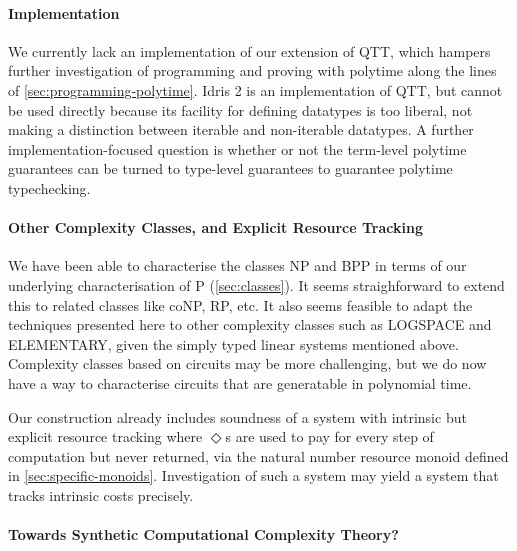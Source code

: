 \documentclass[acmsmall,screen]{acmart}
\begin{document}
\paragraph{Implementation} We currently lack an implementation of our
extension of QTT, which hampers further investigation of programming
and proving with polytime along the lines of
\autoref{sec:programming-polytime}. Idris 2 \cite{Brady21} is an
implementation of QTT, but cannot be used directly because its facility
for defining datatypes is too liberal, not making a distinction
between iterable and non-iterable datatypes. A further
implementation-focused question is whether or not the term-level
polytime guarantees can be turned to type-level guarantees to
guarantee polytime typechecking.

\paragraph{Other Complexity Classes, and Explicit Resource Tracking}
We have been able to characterise the classes NP and BPP in terms of
our underlying characterisation of P (\autoref{sec:classes}). It seems
straighforward to extend this to related classes like coNP, RP,
etc. It also seems feasible to adapt the techniques presented here to
other complexity classes such as LOGSPACE and ELEMENTARY, given the
simply typed linear systems mentioned above. Complexity classes based
on circuits may be more challenging, but we do now have a way to
characterise circuits that are generatable in polynomial
time.

Our construction already includes soundness of a system with intrinsic
but explicit resource tracking where $\Diamond$s are used to pay for
every step of computation but never returned, via the natural number
resource monoid defined in
\autoref{sec:specific-monoids}. Investigation of such a system may
yield a system that tracks intrinsic costs precisely.

\paragraph{Towards Synthetic Computational Complexity Theory?}
\end{document}
